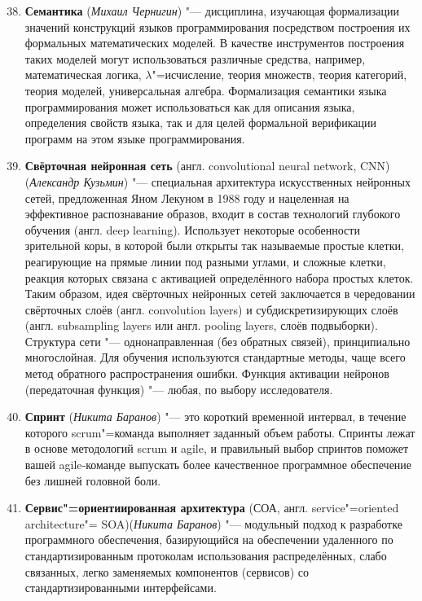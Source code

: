 \begin{enumerate}
\setcounter{enumi}{37}
 
    \item \textbf{Семантика} (\textit{Михаил Чернигин}) "--- 
    дисциплина, изучающая формализации значений конструкций языков программирования посредством построения их формальных математических моделей. В качестве инструментов построения таких моделей могут использоваться различные средства, например, математическая логика, $\lambda$"=исчисление, теория множеств, теория категорий, теория моделей, универсальная алгебра. Формализация семантики языка программирования может использоваться как для описания языка, определения свойств языка, так и для целей формальной верификации программ на этом языке программирования.

    \item \textbf{Свёрточная нейронная сеть} (англ. convolutional neural network, CNN) (\textit{Александр Кузьмин}) "--- 
    специальная архитектура искусственных нейронных сетей, предложенная Яном Лекуном в 1988 году и нацеленная на эффективное распознавание образов, входит в состав технологий глубокого обучения (англ. deep learning). Использует некоторые особенности зрительной коры, в которой были открыты так называемые простые клетки, реагирующие на прямые линии под разными углами, и сложные клетки, реакция которых связана с активацией определённого набора простых клеток. Таким образом, идея свёрточных нейронных сетей заключается в чередовании свёрточных слоёв (англ. convolution layers) и субдискретизирующих слоёв (англ. subsampling layers или англ. pooling layers, слоёв подвыборки). Структура сети "--- однонаправленная (без обратных связей), принципиально многослойная. Для обучения используются стандартные методы, чаще всего метод обратного распространения ошибки. Функция активации нейронов (передаточная функция) "--- любая, по выбору исследователя.

    \item \textbf{Спринт} (\textit{Никита Баранов}) "--- 
    это короткий временной интервал, в течение которого scrum"=команда выполняет заданный объем работы. Спринты лежат в основе методологий scrum и agile, и правильный выбор спринтов поможет вашей agile‑команде выпускать более качественное программное обеспечение без лишней головной боли.

    \item \textbf{Сервис"=ориентиированная архитектура} (СОА, англ. service"=oriented architecture"= SOA)(\textit{Никита Баранов}) "--- 
     модульный подход к разработке программного обеспечения, базирующийся на обеспечении удаленного по стандартизированным протоколам использования распределённых, слабо связанных, легко заменяемых компонентов (сервисов) со стандартизированными интерфейсами.


\end{enumerate}
